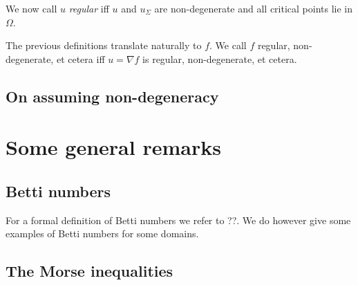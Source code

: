 We now call $u$ \emph{regular} iff $u$ and $u_\Sigma$ are non-degenerate and all critical points lie in $\Omega$.

The previous definitions translate naturally to $f$.
We call $f$ regular, non-degenerate, et cetera iff $u=\nabla f$ is regular, non-degenerate, et cetera.


\subsection{On assuming non-degeneracy}


\section{Some general remarks}


\subsection{Betti numbers}

For a formal definition of Betti numbers we refer to ??.
We do however give some examples of Betti numbers for some domains.

\subsection{The Morse inequalities}

